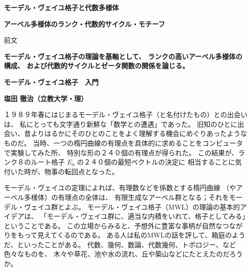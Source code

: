 \documentclass[uplatex,dvipdfmx]{jlreq}
\begin{document}
\begin{center}
  \vspace*{20pt}
  {\Huge\bfseries モーデル・ヴェイユ格子と代数多様体}

  \vspace{30pt}

  {\Large\bfseries アーベル多様体のランク・代数的サイクル・モチーフ}

  \vspace{50pt}

  {\large 前文}

  \vspace{10pt}

  \parbox{0.85\textwidth}{
    \large\bfseries
    モーデル・ヴェイユ格子の理論を基軸として、
    ランクの高いアーベル多様体の構成、
    および代数的サイクルとゼータ関数の関係を論じる。
  }
\end{center}

\vfill

\newpage

\noindent
{\large\bfseries モーデル・ヴェイユ格子　入門}

\medskip
\noindent
{\large\bfseries \hfill 塩田 徹治（立教大学・理）}

\bigskip\bigskip

１９８９年春にはじまるモーデル・ヴェイユ格子（と名付けたもの）との出会いは、
私にとっても文字通り新鮮な「数学との遭遇」であった。
旧知のひとに出会い、昔よりはるかにそのひとのことをよく理解する機会にめぐりあったようなものだ。
当時、一つの楕円曲線の有理点を具体的に求めることをコンピュータで実験してみた所、
特別な形の２４０個の有理点が得られた。
この結果が、ランク８のルート格子 $E_8$ の２４０個の最短ベクトルの決定に
相当することに気付いた時が、物事の転回点となった。

\bigskip

モーデル・ヴェイユの定理によれば、有理数などを係数とする楕円曲線
（やアーベル多様体）の有理点の全体は、
有限生成なアーベル群となる；それをモーデル・ヴェイユ群とよぶ。
モーデル・ヴェイユ格子（MWL）の理論の基本的アイデアは、
「モーデル・ヴェイユ群に、適当な内積をいれて、格子としてみる」ということである。
この立場からみると、予想外に豊富な事柄が自然なつながりをもって見えてくるのである。
ある人は私のMWLの話を評して、箱庭のようだ、といったことがある。
代数、幾何、数論、代数幾何、トポロジー、など色々なものを、
木々や草花、池や水の流れ、丘や築山などにたとえたのだろうか。
\end{document}
